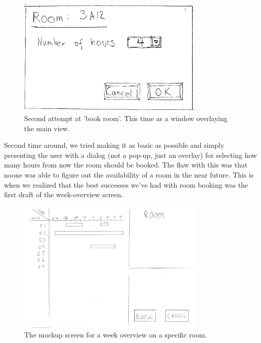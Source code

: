 \begin{figure}[htb]
\begin{center}
\leavevmode
\includegraphics[width=0.8\textwidth]{images/bookRoomMockup2}
\end{center}
\caption{Second attempt at 'book room'. This time as a window overlaying the main view.}
\label{fig:book_room_mockup2}
\end{figure}

Second time around, we tried making it as basic as possible and simply presenting the user with a dialog (not a pop-up, just an overlay) for selecting how many hours from now the room should be booked. The flaw with this was that noone was able to figure out the availability of a room in the near future. This is when we realized that the best successes we've had with room booking was the first draft of the week-overview screen.

\begin{figure}[htb]
\begin{center}
\leavevmode
\includegraphics[width=0.8\textwidth]{images/weekMockup}
\end{center}
\caption{The mockup screen for a week overview on a specific room.}
\label{fig:week_mockup}
\end{figure}

